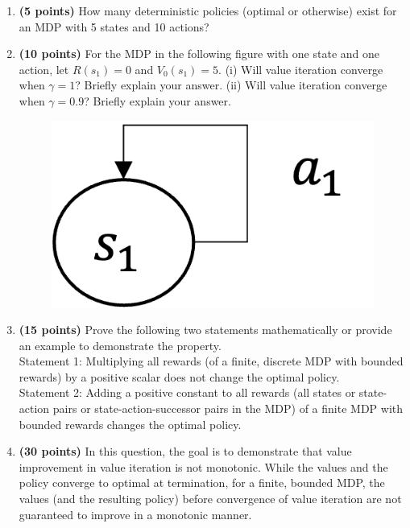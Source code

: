 \documentclass[11pt]{article}
\begin{document}
\begin{enumerate}
	
	\item  \textbf{(5 points)} How many deterministic policies (optimal or otherwise) exist for an MDP with 5 states and 10 actions?
	
	

	\item \textbf{(10 points)} For the MDP in the following figure with one state and one action, let $R(s_1) = 0$ and $V_0(s_1) = 5$. (i) Will value iteration converge when $\gamma=1$? Briefly explain your answer. (ii) Will value iteration converge when $\gamma=0.9$? Briefly explain your answer.
	
		\begin{figure}[h]
		\centering
		\includegraphics[scale=0.65]{mdp1.png}
	\end{figure}
	
	\item \textbf{(15 points)} Prove the following two statements mathematically or provide an example to demonstrate the property.  \\
  Statement 1: Multiplying all rewards (of a finite, discrete MDP with bounded rewards) by a positive scalar does not change the optimal policy. \\Statement 2: Adding a positive constant to all rewards (all states or state-action pairs or state-action-successor pairs in the MDP) of a finite MDP with bounded rewards changes the optimal policy. 
	
	\item  \textbf{(30 points)} In this question, the goal is to demonstrate that value improvement in value iteration is not monotonic. While the values and the policy converge to optimal at termination, for a finite, bounded MDP, the values (and the resulting policy) before convergence of value iteration are not guaranteed to improve in a monotonic manner. 
	

\end{enumerate}
\end{document}
